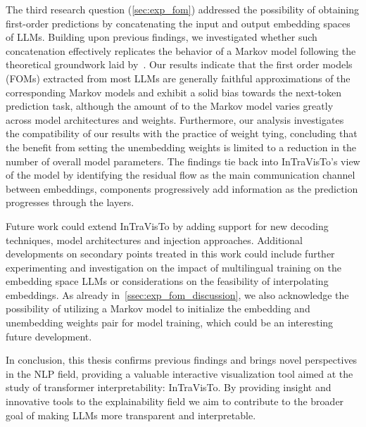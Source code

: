 The third research question (\cref{sec:exp_fom}) addressed the possibility of obtaining first-order predictions by concatenating the input and output embedding spaces of LLMs.
Building upon previous findings, we investigated whether such concatenation effectively replicates the behavior of a Markov model following the theoretical groundwork laid by~\citet{elhage2021}.
Our results indicate that the first order models (FOMs) extracted from most LLMs are generally faithful approximations of the corresponding Markov models and exhibit a solid bias towards the next-token prediction task, although the amount of  to the Markov model varies greatly across model architectures and weights.
Furthermore, our analysis investigates the compatibility of our results with the practice of weight tying, concluding that the benefit from setting the unembedding weights  is limited to a reduction in the number of overall model parameters. 
The  findings tie back into InTraVisTo's view of the model by identifying the residual flow as the main communication channel between embeddings,  components progressively add information as the prediction progresses through the layers.

Future work could extend InTraVisTo by adding support for new decoding techniques, model architectures and injection approaches.
Additional developments on  secondary points treated in this work could include further experimenting and investigation on the impact of multilingual training on the embedding space LLMs or  considerations on the feasibility of interpolating embeddings.
As already  in~\cref{ssec:exp_fom_discussion}, we also acknowledge the possibility of utilizing a Markov model to initialize the embedding and unembedding weights pair for model training, which could be an interesting future development.

In conclusion, this thesis confirms previous findings and brings novel perspectives in the NLP field, providing a valuable interactive visualization tool aimed at  the study of transformer interpretability: InTraVisTo.
By providing insight and innovative tools to the explainability field we aim to contribute to the broader goal of making LLMs more transparent and interpretable.
